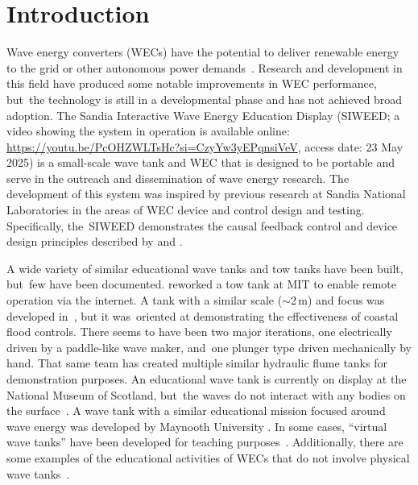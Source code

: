 \documentclass[hardware,article,submit,pdftex,moreauthors]{Definitions/mdpi}
\begin{document}
\section{Introduction}
Wave energy converters (WECs) have the potential to deliver renewable energy to the grid or other autonomous power demands~\cite{Hagerman:2011aa,Clement2002,FALCAO2010899}.
Research and development in this field have produced some notable improvements in WEC performance, but~the technology is still in a developmental phase and has not achieved broad adoption.
The Sandia Interactive Wave Energy Education Display (SIWEED; a video showing the system in operation is available online: %
 \url{https://youtu.be/PcOHZWLTsHc?si=CzyYw3yEPqnsiVeV}, access date: 23 May 2025) is a small-scale wave tank and WEC that is designed to be portable and serve in the outreach and dissemination of wave energy research.
The development of this system was inspired by previous research at Sandia National Laboratories in the areas of WEC device and control design and testing.
Specifically, the~SIWEED demonstrates the causal feedback control and device design principles described by \citet{Bacelli2020} and \citet{Coe:2021aa}.

A wide variety of similar educational wave tanks and tow tanks have been built, but~few have been documented.
\citet{unger2006creating} reworked a tow tank at MIT to enable remote operation via the internet.
A tank with a similar scale ($\sim$2\,m) and focus was developed in~\cite{Trust2015}, but it was~oriented at demonstrating the effectiveness of coastal flood controls.
There seems to have been two major iterations, one electrically driven by a paddle-like wave maker, and~one plunger type driven mechanically by hand. 
That same team has created multiple similar hydraulic flume tanks for demonstration purposes.
An educational wave tank is currently on display at the National Museum of Scotland, but~the waves do not interact with any bodies on the surface~\cite{Ivan2016}.
A wave tank with a similar educational mission focused around wave energy was developed by Maynooth University \cite{Maynooth}.
In some cases, ``virtual wave tanks'' have been developed for teaching purposes~\cite{Ryu:2003aa}.
Additionally, there are some examples of the educational activities of WECs that do not involve physical wave tanks~\cite{Huynh:2016aa,Satriawan:2022aa,Satriawan:2024aa}.
\end{document}
